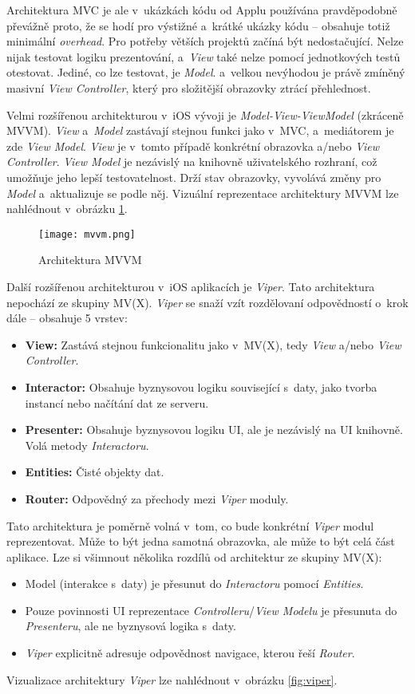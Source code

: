 Architektura MVC je ale v~ukázkách kódu od Applu používána pravděpodobně převážně proto, že se hodí pro výstižné a~krátké ukázky kódu – obsahuje totiž minimální \emph{overhead}. Pro potřeby větších projektů začíná být nedostačující. Nelze nijak testovat logiku prezentování, a~\emph{View} také nelze pomocí jednotkových testů otestovat. Jediné, co lze testovat, je \emph{Model}. a~velkou nevýhodou je právě zmíněný masivní \emph{View Controller}, který pro složitější obrazovky ztrácí přehlednost.

Velmi rozšířenou architekturou v~iOS vývoji je \emph{Model-View-ViewModel} (zkráceně MVVM). \emph{View} a~\emph{Model} zastávají stejnou funkci jako v~MVC, a~mediátorem je zde \emph{View Model}. \emph{View} je v~tomto případě konkrétní obrazovka a/nebo \emph{View Controller}. \emph{View Model} je nezávislý na knihovně uživatelského rozhraní, což umožňuje jeho lepší testovatelnost. Drží stav obrazovky, vyvolává změny pro \emph{Model} a~aktualizuje se podle něj. Vizuální reprezentace architektury MVVM lze nahlédnout v~obrázku \ref{fig:mvvm}.

\begin{figure}[h]
	\centering
	\texttt{[image: mvvm.png]}
	\caption{Architektura MVVM \cite{ios-architecture-patterns}}
	\label{fig:mvvm}
\end{figure}

Další rozšířenou architekturou v~iOS aplikacích je \emph{Viper}. Tato architektura nepochází ze skupiny MV(X). \emph{Viper} se snaží vzít rozdělovaní odpovědností o~krok dále – obsahuje 5 vrstev:
\begin{itemize}
\item\textbf{View:} Zastává stejnou funkcionalitu jako v~MV(X), tedy \emph{View} a/nebo \emph{View Controller}.
\item\textbf{Interactor:} Obsahuje byznysovou logiku související s~daty, jako tvorba instancí nebo načítání dat ze serveru.
\item\textbf{Presenter:} Obsahuje byznysovou logiku UI, ale je nezávislý na UI knihovně. Volá metody \emph{Interactoru}.
\item\textbf{Entities:} Čisté objekty dat.
\item\textbf{Router:} Odpovědný za přechody mezi \emph{Viper} moduly.
\end{itemize}
Tato architektura je poměrně volná v~tom, co bude konkrétní \emph{Viper} modul reprezentovat. Může to být jedna samotná obrazovka, ale může to být celá část aplikace. Lze si všimnout několika rozdílů od architektur ze skupiny MV(X):
\begin{itemize}
\item Model (interakce s~daty) je přesunut do \emph{Interactoru} pomocí \emph{Entities}.
\item Pouze povinnosti UI reprezentace \emph{Controlleru}/\emph{View Modelu} je přesunuta do \emph{Presenteru}, ale ne byznysová logika s~daty.
\item \emph{Viper} explicitně adresuje odpovědnost navigace, kterou řeší \emph{Router}.
\end{itemize}
Vizualizace architektury \emph{Viper} lze nahlédnout v~obrázku \ref{fig:viper}. \cite{ios-architecture-patterns}

